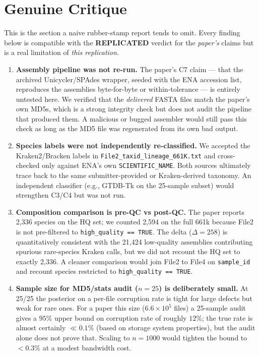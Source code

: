 \documentclass[11pt]{article}
\begin{document}
\section{Genuine Critique}

This is the section a naive rubber-stamp report tends to omit. Every finding below is
compatible with the \textbf{REPLICATED} verdict for the \emph{paper's} claims but is a real
limitation of \emph{this replication}.

\begin{enumerate}
\item \textbf{Assembly pipeline was not re-run.} The paper's C7 claim --- that the archived
Unicycler/SPAdes wrapper, seeded with the ENA accession list, reproduces the assemblies
byte-for-byte or within-tolerance --- is entirely untested here. We verified that the
\emph{delivered} FASTA files match the paper's own MD5s, which is a strong integrity check but
does not audit the pipeline that produced them. A malicious or bugged assembler would still
pass this check as long as the MD5 file was regenerated from its own bad output.

\item \textbf{Species labels were not independently re-classified.} We accepted the
Kraken2/Bracken labels in \texttt{File2\_taxid\_lineage\_661K.txt} and cross-checked only
against ENA's own \texttt{SCIENTIFIC\_NAME}. Both sources ultimately trace back to the same
submitter-provided or Kraken-derived taxonomy. An independent classifier (e.g., GTDB-Tk on the
25-sample subset) would strengthen C3/C4 but was not run.

\item \textbf{Composition comparison is pre-QC vs post-QC.} The paper reports 2,336 species on
the HQ set; we counted 2,594 on the full 661k because File2 is not pre-filtered to
\texttt{high\_quality == TRUE}. The delta ($\Delta=258$) is quantitatively consistent with the
21,424 low-quality assemblies contributing spurious rare-species Kraken calls, but we did not
recount the HQ set to exactly 2,336. A cleaner comparison would join File2 to File4 on
\texttt{sample\_id} and recount species restricted to \texttt{high\_quality == TRUE}.

\item \textbf{Sample size for MD5/stats audit ($n=25$) is deliberately small.} At 25/25 the
posterior on a per-file corruption rate is tight for large defects but weak for rare ones.
For a paper this size ($6.6 \times 10^5$ files) a 25-sample audit gives a $95\%$ upper bound
on corruption rate of roughly $12\%$; the true rate is almost certainly $\ll 0.1\%$ (based on
storage system properties), but the audit alone does not prove that. Scaling to $n=1000$ would
tighten the bound to $<0.3\%$ at a modest bandwidth cost.


\end{enumerate}
\end{document}
